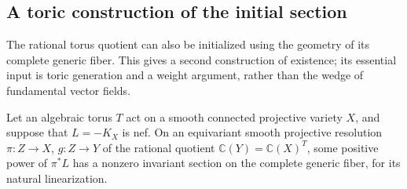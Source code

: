 \subsection{A toric construction of the initial section}

The rational torus quotient can also be initialized using the geometry of
its complete generic fiber. This gives a second construction of existence;
its essential input is toric generation and a weight argument, rather than
the wedge of fundamental vector fields.

\begin{lemma}\label{g:cf:toric-initial-section}
Let an algebraic torus $T$ act on a smooth connected projective variety
$X$, and suppose that $L=-K_X$ is nef. On an equivariant smooth projective
resolution $\pi:Z\to X$, $g:Z\to Y$ of the rational quotient
$\mathbb C(Y)=\mathbb C(X)^T$, some positive power of $\pi^*L$ has a
nonzero invariant section on the complete generic fiber, for its natural
linearization.
\end{lemma}

